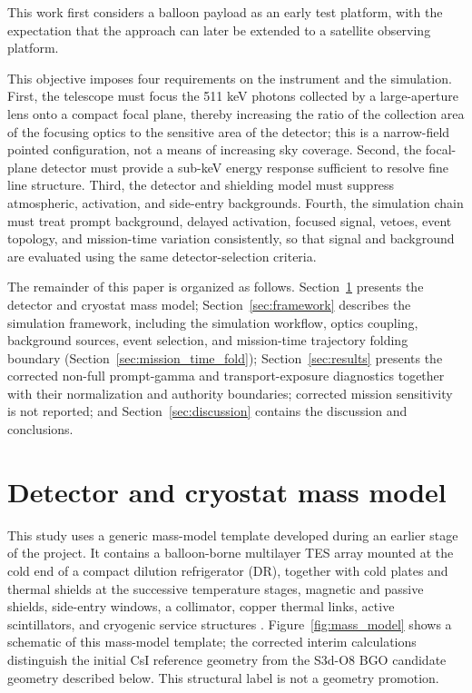 \documentclass[11pt]{article}
\begin{document}
This work first considers a balloon payload as an early test platform, with the
expectation that the approach can later be extended to a satellite observing
platform.

This objective imposes four requirements on the instrument and the simulation.
First, the telescope must focus the 511 keV photons collected by a large-aperture
lens onto a compact focal plane, thereby increasing the ratio of the collection
area of the focusing optics to the sensitive area of the detector; this is a
narrow-field pointed configuration, not a means of increasing sky coverage.
Second, the focal-plane detector must provide a sub-keV energy response
sufficient to resolve fine line structure. Third, the detector and shielding
model must suppress atmospheric, activation, and side-entry backgrounds.
Fourth, the simulation chain must treat prompt background, delayed activation,
focused signal, vetoes, event topology, and mission-time variation consistently,
so that signal and background are evaluated using the same detector-selection
criteria.

The remainder of this paper is organized as follows. Section~\ref{sec:geometry}
presents the detector and cryostat mass model; Section~\ref{sec:framework}
describes the simulation framework, including the simulation workflow, optics
coupling, background sources, event selection, and mission-time trajectory
folding boundary (Section~\ref{sec:mission_time_fold});
Section~\ref{sec:results} presents the corrected non-full prompt-gamma and
transport-exposure diagnostics together with their normalization and authority
boundaries; corrected mission sensitivity is not reported; and
Section~\ref{sec:discussion} contains the discussion and conclusions.

\endgroup

\section{Detector and cryostat mass model}
\label{sec:geometry}

This study uses a generic mass-model template developed during an earlier stage
of the project. It contains a balloon-borne multilayer TES array mounted at the
cold end of a compact dilution refrigerator (DR), together with cold plates and
thermal shields at the successive temperature stages, magnetic and passive
shields, side-entry windows, a collimator, copper thermal links, active
scintillators, and cryogenic service structures
\cite{Shirazi2023,Gottardi2021TESReview}. Figure~\ref{fig:mass_model} shows a
schematic of this mass-model template; the corrected interim calculations
distinguish the initial CsI reference geometry from the S3d-O8 BGO candidate
geometry described below. This structural label is not a geometry promotion.
\end{document}
